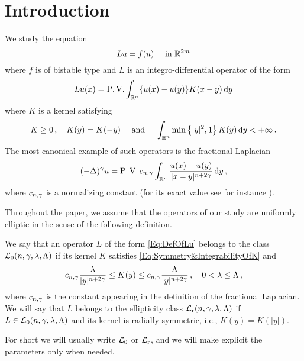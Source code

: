 \section{Introduction}
\label{Sec:Introduction}


We study the equation
\begin{equation}
\label{Eq:NonlocalAllenCahn}
Lu = f(u) \quad \textrm{ in } \mathbb{R}^{2m}
\end{equation}
where $f$ is of bistable type and $L$ is an integro-differential operator of the form
\begin{equation}
\label{Eq:DefOfLu}
Lu(x) = \operatorname{P.V.} \int_{\mathbb{R}^n} \{u(x) - u(y)\} K(x-y)\,\mathrm{d} y
\end{equation}
where $K$ is a  kernel satisfying
\begin{equation}
\label{Eq:Symmetry&IntegrabilityOfK}
K\geq 0\,, \quad K(y) = K(-y) \quad \textrm{ and } \quad \int_{\mathbb{R}^n} \min \left\{ |y|^2, 1 \right\} K(y) \,\mathrm{d} y < + \infty\,.
\end{equation}
The most canonical example of such operators is the fractional Laplacian
$$
(-\Delta)^\gamma u = \operatorname{P.V.} c_{n, \gamma}\int_{\mathbb{R}^n} \dfrac{u(x) - u(y)}{|x-y|^{n + 2\gamma}}\,\mathrm{d} y\,,
$$
where $c_{n, \gamma}$ is a normalizing constant (for its exact value see for instance \cite{HitchhikerGuide}).

Throughout the paper, we assume that the operators of our study are uniformly elliptic in the sense of the following definition.
\begin{definition}
\label{Def:L_0Class}
We say that an operator $L$ of the form \eqref{Eq:DefOfLu} belongs to the class $\mathcal{L}_0(n,\gamma,\lambda, \Lambda)$ if its kernel $K$ satisfies \eqref{Eq:Symmetry&IntegrabilityOfK} and \begin{equation}
\label{Eq:Ellipticity}
c_{n,\gamma}\dfrac{\lambda}{|y|^{n+2\gamma}} \leq K(y) \leq c_{n,\gamma}\dfrac{\Lambda}{|y|^{n+2\gamma}}\,, \quad 0< \lambda \leq \Lambda \,,
\end{equation}
where $c_{n,\gamma}$ is the constant appearing in the definition of the fractional Laplacian. We will say that $L$ belongs to the ellipticity class $\mathcal{L}_{\mathrm{r}}(n,\gamma,\lambda, \Lambda)$ if $L\in \mathcal{L}_0(n,\gamma,\lambda, \Lambda)$ and its kernel is radially symmetric, i.e., $K(y)=K(|y|)$.
\end{definition}
For short we will usually write $\mathcal{L}_0$ or $\mathcal{L}_{\mathrm{r}}$, and we will make explicit the parameters only when needed.



